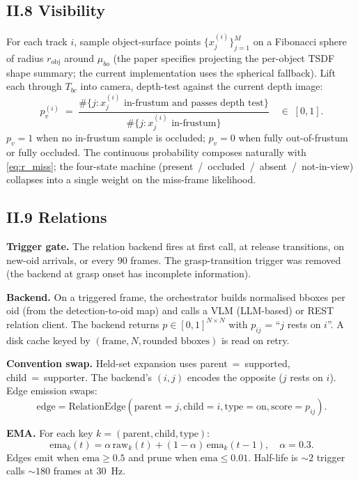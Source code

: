 \documentclass[11pt]{article}
\begin{document}
\subsection*{II.8 Visibility}\label{sec:vis}

For each track $i$, sample object-surface points
$\{x_j^{(i)}\}_{j=1}^M$ on a Fibonacci sphere of radius $r_{\text{obj}}$
around $\mu_{bo}$ (the paper specifies projecting the per-object TSDF
shape summary; the current implementation uses the spherical fallback).
Lift each through $T_{bc}$ into camera, depth-test against the current depth
image:
\begin{equation}\label{eq:pv}
p_v^{(i)} \;=\;
\frac{\#\bigl\{j : x_j^{(i)} \text{ in-frustum and passes depth test}\bigr\}}
     {\#\bigl\{j : x_j^{(i)} \text{ in-frustum}\bigr\}}
\quad\in\;[0,1].
\end{equation}
$p_v=1$ when no in-frustum sample is occluded; $p_v=0$ when fully
out-of-frustum or fully occluded. The continuous probability composes
naturally with \eqref{eq:r_miss}; the four-state machine
(present~/~occluded~/~absent~/~not-in-view) collapses into a single weight
on the miss-frame likelihood.

\subsection*{II.9 Relations}

\textbf{Trigger gate.} The relation backend fires at first call, at release
transitions, on new-oid arrivals, or every 90 frames. The grasp-transition
trigger was removed (the backend at grasp onset has incomplete information).

\textbf{Backend.} On a triggered frame, the orchestrator builds normalised
bboxes per oid (from the detection-to-oid map) and calls a VLM (LLM-based)
or REST relation client. The backend returns $p\in[0,1]^{N\times N}$ with
$p_{ij}$ = ``$j$ rests on $i$''. A disk cache keyed by
$(\text{frame}, N, \text{rounded bboxes})$ is read on retry.

\textbf{Convention swap.} Held-set expansion uses parent~=~supported,
child~=~supporter. The backend's $(i,j)$ encodes the opposite ($j$ rests on
$i$). Edge emission swaps:
$$\mathrm{edge} = \mathrm{RelationEdge}(\text{parent}=j,\text{child}=i,\text{type}=\text{on},\text{score}=p_{ij}).$$

\textbf{EMA.} For each key $k=(\text{parent},\text{child},\text{type})$:
$$\mathrm{ema}_k(t) = \alpha\,\mathrm{raw}_k(t) + (1-\alpha)\,\mathrm{ema}_k(t-1),\quad \alpha=0.3.$$
Edges emit when $\mathrm{ema}\ge 0.5$ and prune when $\mathrm{ema}\le
0.01$. Half-life is $\sim\!2$ trigger calls $\sim\!180$ frames at 30~Hz.
\end{document}
